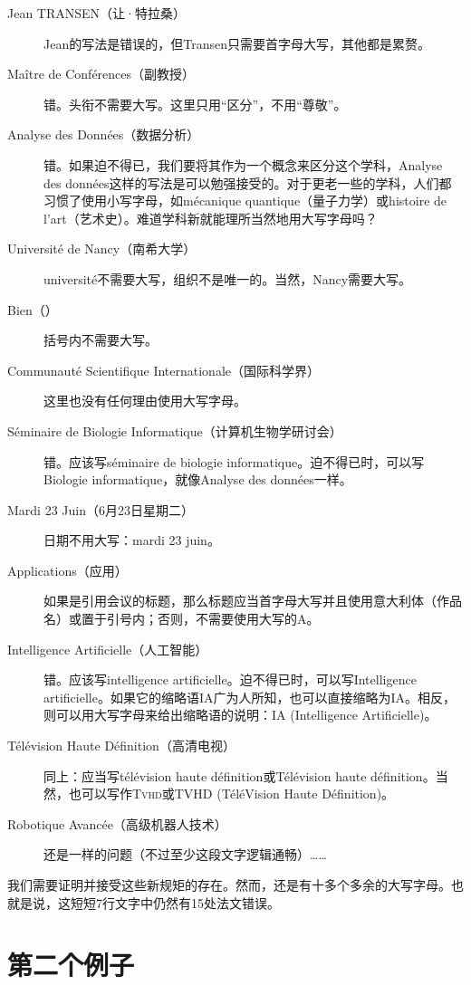 \begin{description}
    \item[Jean TRANSEN（让·特拉桑）] Jean的写法是错误的，但Transen只需要首字母大写，其他都是累赘。
    \item[Maître de Conférences（副教授）] 错。头衔不需要大写。这里只用``区分''，不用``尊敬''。
    \item[Analyse des Données（数据分析）] 错。如果迫不得已，我们要将其作为一个概念来区分这个学科，Analyse des données这样的写法是可以勉强接受的。对于更老一些的学科，人们都习惯了使用小写字母，如mécanique quantique（量子力学）或histoire de l'art（艺术史）。难道学科新就能理所当然地用大写字母吗？
    \item[Université de Nancy（南希大学）] université不需要大写，组织不是唯一的。当然，Nancy需要大写。
    \item[Bien（）] 括号内不需要大写。
    \item[Communauté Scientifique Internationale（国际科学界）] 这里也没有任何理由使用大写字母。
    \item[Séminaire de Biologie Informatique（计算机生物学研讨会）] 错。应该写séminaire de biologie informatique。迫不得已时，可以写Biologie informatique，就像Analyse des données一样。
    \item[Mardi 23 Juin（6月23日星期二）] 日期不用大写：mardi 23 juin。
    \item[Applications（应用）] 如果是引用会议的标题，那么标题应当首字母大写并且使用意大利体（作品名）或置于引号内；否则，不需要使用大写的A。
    \item[Intelligence Artificielle（人工智能）] 错。应该写intelligence artificielle。迫不得已时，可以写Intelligence artificielle。如果它的缩略语IA广为人所知，也可以直接缩略为IA。相反，则可以用大写字母来给出缩略语的说明：IA (Intelligence Artificielle)。
    \item[Télévision Haute Définition（高清电视）] 同上：应当写télévision haute définition或Télévision haute définition。当然，也可以写作\textsc{Tvhd}或TVHD (TéléVision Haute Définition)。
    \item[Robotique Avancée（高级机器人技术）] 还是一样的问题（不过至少这段文字逻辑通畅）……
\end{description}

我们需要证明并接受这些新规矩的存在。然而，还是有十多个多余的大写字母。也就是说，这短短7行文字中仍然有15处法文错误。

\section{第二个例子}

